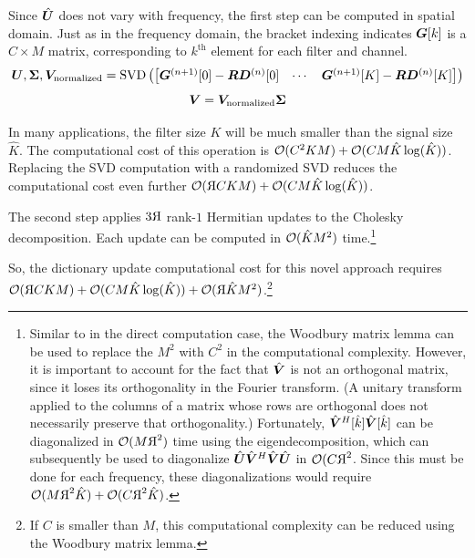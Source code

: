 Since $\hat{\bm{U}}$ does not vary with frequency, the first step can be computed in spatial domain. Just as in the frequency domain, the bracket indexing indicates $\bm{G}[k]$ is a $C \times M$ matrix, corresponding to $k^{\text{th}}$ element for each filter and channel.
\begin{equation}
\bm{U},\bm{\Sigma},\bm{V}_{\text{normalized}} = \operatorname{SVD}\left(\begin{bmatrix}\bm{G}^{(n + 1)}[0] - \bm{R}\bm{D}^{(n)}[0] & \cdots & \bm{G}^{(n + 1)}[K] - \bm{R}\bm{D}^{(n)}[K]    \end{bmatrix}\right)
\end{equation}
\begin{equation}
\bm{V} = \bm{V}_{\text{normalized}}\bm{\Sigma}
\end{equation}

In many applications, the filter size $K$ will be much smaller than the signal size $\hat{K}$.  The computational cost of this operation is $\mathcal{O}(C^2KM) + \mathcal{O}(CM\hat{K}\operatorname{log}(\hat{K}))$. Replacing the SVD computation with a randomized SVD reduces the computational cost even further $\bigO(\reflectbox{R}CKM) + \bigO(CM\hat{K}\operatorname{log}(\hat{K}))$.

The second step applies $3\reflectbox{R}$ rank-$1$ Hermitian updates to the Cholesky decomposition. Each update can be computed in $\mathcal{O}(\hat{K}M^2)$ time.\footnote{Similar to in the direct computation case, the Woodbury matrix lemma can be used to replace the $M^2$ with $C^2$ in the computational complexity. However, it is important to account for the fact that $\hat{\bm{V}}$ is not an orthogonal matrix, since it loses its orthogonality in the Fourier transform. (A unitary transform applied to the columns of a matrix whose rows are orthogonal does not necessarily preserve that orthogonality.) Fortunately, $\hat{\bm{V}}^H[\hat{k}]\hat{\bm{V}}[\hat{k}]$ can be diagonalized in $\bigO(M\reflectbox{R}^2)$ time using the eigendecomposition, which can subsequently be used to diagonalize $\hat{\bm{U}}\hat{\bm{V}}^H\hat{\bm{V}}\hat{\bm{U}}$ in $\bigO(C\reflectbox{R}^2$. Since this must be done for each frequency, these diagonalizations would require $\bigO(M\reflectbox{R}^2\hat{K}) + \bigO(C\reflectbox{R}^2\hat{K})$.}  

So, the dictionary update computational cost for this novel approach requires $\bigO(\reflectbox{R}CKM) + \bigO(CM\hat{K}\operatorname{log}(\hat{K})) + \bigO(\reflectbox{R}\hat{K}M^2)$.\footnote{If $C$ is smaller than $M$, this computational complexity can be reduced using the Woodbury matrix lemma.}


